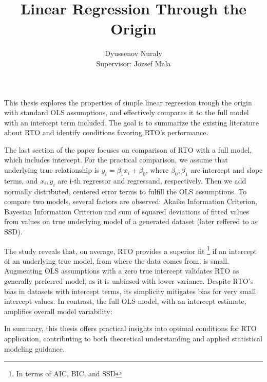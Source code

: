 \documentclass[]{article}
\title{Linear Regression Through the Origin}
\author{Dyussenov Nuraly \\
	Supervisor: Jozsef Mala}
\begin{document}
	
	\maketitle
	
	\begin{abstract}
		
	\end{abstract}

This thesis explores the properties of simple linear regression trough the origin with standard OLS assumptions, and effectively compares it to the full model with an intercept term included. The goal is to summarize the existing literature about RTO and identify conditions favoring RTO's performance.

The last section of the paper focuses on comparison of RTO with a full model, which includes intercept. For the practical comparison, we assume that underlying true relationship is $y_i = \beta_1 x_i + \beta_0$, where $\beta_0, \beta_1$ are intercept and slope terms, and $x_i, y_i$ are i-th regressor and regressand, respectively. Then we add normally distributed, centered error terms to fulfill the OLS assumptions. To compare two models, several factors are observed: Akaike Information Criterion, Bayesian Information Criterion and sum of squared deviations of fitted values from values on true underlying model of a generated dataset (later reffered to as SSD).

The study reveals that, on average, RTO provides a superior fit \footnote{In terms of AIC, BIC, and SSD} if an intercept of an underlying true model, from where the data comes from, is small. Augmenting OLS assumptions with a zero true intercept validates RTO as generally preferred model, as it is unbiased with lower variance. Despite RTO's bias in datasets with intercept terms, its simplicity mitigates bias for very small intercept values. In contrast, the full OLS model, with an intercept estimate, amplifies overall model variability:

In summary, this thesis offers practical insights into optimal conditions for RTO application, contributing to both theoretical understanding and applied statistical modeling guidance.

	
\end{document}
